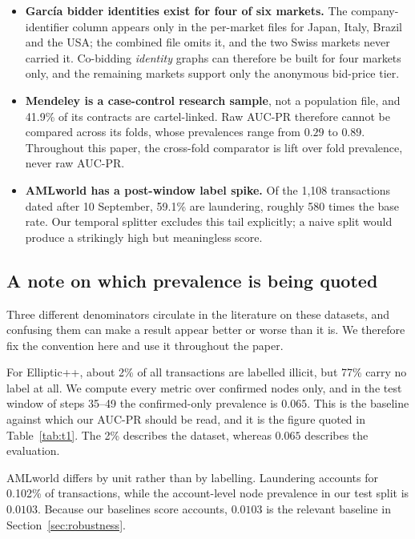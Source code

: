 \documentclass[conference]{IEEEtran}
\begin{document}
\begin{itemize}
\item \textbf{Garc\'ia bidder identities exist for four of six markets.} The
company-identifier column appears only in the per-market files for Japan, Italy,
Brazil and the USA; the combined file omits it, and the two Swiss markets never
carried it. Co-bidding \emph{identity} graphs can therefore be built for four
markets only, and the remaining markets support only the anonymous bid-price
tier.
\item \textbf{Mendeley is a case-control research sample}, not a population
file, and 41.9\% of its contracts are cartel-linked. Raw AUC-PR therefore
cannot be compared across its folds, whose prevalences range from $0.29$ to
$0.89$. Throughout this paper, the cross-fold comparator is lift over fold
prevalence, never raw AUC-PR.
\item \textbf{AMLworld has a post-window label spike.} Of the 1,108
transactions dated after 10 September, 59.1\% are laundering, roughly 580 times
the base rate. Our temporal splitter excludes this tail explicitly; a naive
split would produce a strikingly high but meaningless score.
\end{itemize}

\subsection{A note on which prevalence is being quoted}
\label{sec:prevalence}

Three different denominators circulate in the literature on these datasets,
and confusing them can make a result appear better or worse than it is. We
therefore fix the convention here and use it throughout the paper.

For Elliptic++, about 2\% of all transactions are labelled illicit, but 77\%
carry no label at all. We compute every metric over confirmed nodes only, and in
the test window of steps 35--49 the confirmed-only prevalence is $0.065$. This
is the baseline against which our AUC-PR should be read, and it is the figure
quoted in Table~\ref{tab:t1}. The 2\% describes the dataset, whereas $0.065$
describes the evaluation.

AMLworld differs by unit rather than by labelling. Laundering accounts for
0.102\% of transactions, while the account-level node prevalence in our test
split is $0.0103$. Because our baselines score accounts, $0.0103$ is the
relevant baseline in Section~\ref{sec:robustness}.
\end{document}
